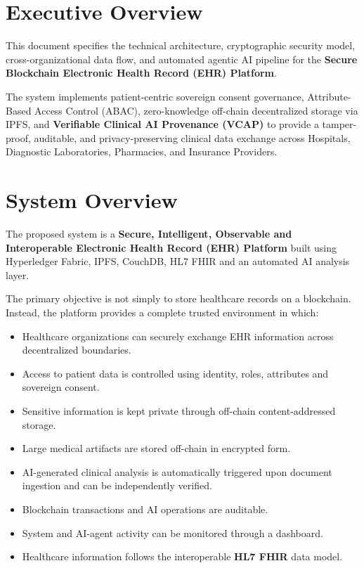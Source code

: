 \documentclass[11pt,a4paper]{article}
\begin{document}
\newpage
\section*{Executive Overview}

This document specifies the technical architecture, cryptographic security model, cross-organizational data flow, and automated agentic AI pipeline for the \textbf{Secure Blockchain Electronic Health Record (EHR) Platform}. 

The system implements patient-centric sovereign consent governance, Attribute-Based Access Control (ABAC), zero-knowledge off-chain decentralized storage via IPFS, and \textbf{Verifiable Clinical AI Provenance (VCAP)} to provide a tamper-proof, auditable, and privacy-preserving clinical data exchange across Hospitals, Diagnostic Laboratories, Pharmacies, and Insurance Providers.

\vspace{1.5cm}
\tableofcontents

\newpage
\section{System Overview}

The proposed system is a \textbf{Secure, Intelligent, Observable and Interoperable Electronic Health Record (EHR) Platform} built using Hyperledger Fabric, IPFS, CouchDB, HL7 FHIR and an automated AI analysis layer.

The primary objective is not simply to store healthcare records on a blockchain. Instead, the platform provides a complete trusted environment in which:
\begin{itemize}
    \item Healthcare organizations can securely exchange EHR information across decentralized boundaries.
    \item Access to patient data is controlled using identity, roles, attributes and sovereign consent.
    \item Sensitive information is kept private through off-chain content-addressed storage.
    \item Large medical artifacts are stored off-chain in encrypted form.
    \item AI-generated clinical analysis is automatically triggered upon document ingestion and can be independently verified.
    \item Blockchain transactions and AI operations are auditable.
    \item System and AI-agent activity can be monitored through a dashboard.
    \item Healthcare information follows the interoperable \textbf{HL7 FHIR} data model.
\end{itemize}
\end{document}
